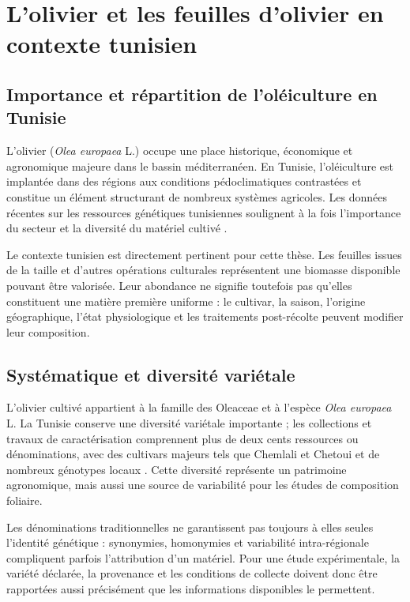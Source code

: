 \section{L'olivier et les feuilles d'olivier en contexte tunisien}

\subsection{Importance et répartition de l'oléiculture en Tunisie}

L'olivier (\textit{Olea europaea} L.) occupe une place historique, économique et agronomique majeure dans le bassin méditerranéen. En Tunisie, l'oléiculture est implantée dans des régions aux conditions pédoclimatiques contrastées et constitue un élément structurant de nombreux systèmes agricoles. Les données récentes sur les ressources génétiques tunisiennes soulignent à la fois l'importance du secteur et la diversité du matériel cultivé \citep{Debbabi2022}.

Le contexte tunisien est directement pertinent pour cette thèse. Les feuilles issues de la taille et d'autres opérations culturales représentent une biomasse disponible pouvant être valorisée. Leur abondance ne signifie toutefois pas qu'elles constituent une matière première uniforme : le cultivar, la saison, l'origine géographique, l'état physiologique et les traitements post-récolte peuvent modifier leur composition.

\subsection{Systématique et diversité variétale}

L'olivier cultivé appartient à la famille des Oleaceae et à l'espèce \textit{Olea europaea} L. La Tunisie conserve une diversité variétale importante ; les collections et travaux de caractérisation comprennent plus de deux cents ressources ou dénominations, avec des cultivars majeurs tels que Chemlali et Chetoui et de nombreux génotypes locaux \citep{Debbabi2022}. Cette diversité représente un patrimoine agronomique, mais aussi une source de variabilité pour les études de composition foliaire.

Les dénominations traditionnelles ne garantissent pas toujours à elles seules l'identité génétique : synonymies, homonymies et variabilité intra-régionale compliquent parfois l'attribution d'un matériel. Pour une étude expérimentale, la variété déclarée, la provenance et les conditions de collecte doivent donc être rapportées aussi précisément que les informations disponibles le permettent.

